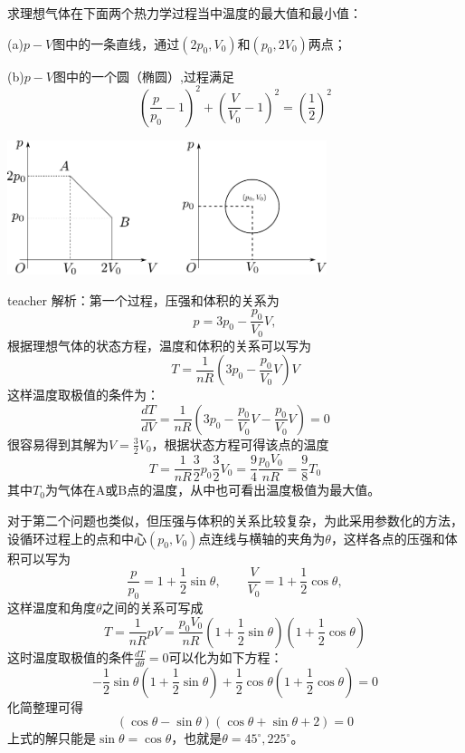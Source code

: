 \begin{example}
求理想气体在下面两个热力学过程当中温度的最大值和最小值：

(a)$p-V$图中的一条直线，通过$(2p_0,V_0)$和$(p_0,2V_0)$两点；

(b)$p-V$图中的一个圆（椭圆）,过程满足\[(\frac{p}{p_0}-1)^2+(\frac{V}{V_0}-1)^2=\left(\frac{1}{2}\right)^2\]
\begin{center}
\includegraphics[width=0.7\textwidth]{images/cal-3.pdf} 
\end{center}
\begin{taggedblock}{teacher}
\noindent
解析：第一个过程，压强和体积的关系为\[p=3p_0-\frac{p_0}{V_0}V,\]
根据理想气体的状态方程，温度和体积的关系可以写为
\[
T=\frac{1}{nR}(3p_0-\frac{p_0}{V_0}V)V
\]
这样温度取极值的条件为：
\[
\frac{dT}{dV} = \frac{1}{nR}(3p_0-\frac{p_0}{V_0}V-\frac{p_0}{V_0}V)=0
\]
很容易得到其解为$V=\frac{3}{2}V_0$，根据状态方程可得该点的温度
\[
T=\frac{1}{nR}\frac{3}{2}p_0\frac{3}{2}V_0 = \frac{9}{4}\frac{p_0V_0}{nR} = \frac{9}{8}T_0
\]
其中$T_0$为气体在A或B点的温度，从中也可看出温度极值为最大值。

对于第二个问题也类似，但压强与体积的关系比较复杂，为此采用参数化的方法，设循环过程上的点和中心$(p_0,V_0)$点连线与横轴的夹角为$\theta$，这样各点的压强和体积可以写为
\[
\frac{p}{p_0}=1+\frac{1}{2}\sin\theta,\qquad \frac{V}{V_0}=1+\frac{1}{2}\cos\theta,
\]
这样温度和角度$\theta$之间的关系可写成
\[
T=\frac{1}{nR}pV = \frac{p_0V_0}{nR}(1+\frac{1}{2}\sin\theta)(1+\frac{1}{2}\cos\theta)
\]
这时温度取极值的条件$\frac{dT}{d\theta}=0$可以化为如下方程：
\[
-\frac{1}{2}\sin\theta(1+\frac{1}{2}\sin\theta)+\frac{1}{2}\cos\theta(1+\frac{1}{2}\cos\theta)=0
\]
化简整理可得
\[
(\cos\theta-\sin\theta)(\cos\theta+\sin\theta+2)=0
\]
上式的解只能是$\sin\theta=\cos\theta$，也就是$\theta = 45^\circ,225^\circ$。

\end{taggedblock}
\end{example}



